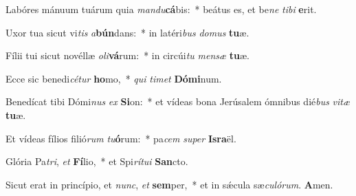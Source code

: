 ﻿\item Labóres mánuum tuárum quia \textit{man}\textit{du}\textbf{cá}bis:~* beátus es, et be\textit{ne} \textit{ti}\textit{bi} \textbf{e}rit.
\item Uxor tua sicut vi\textit{tis} \textit{a}\-\textbf{bún}\-dans:~* in latéri\textit{bus} \textit{do}\textit{mus} \textbf{tu}æ.
\item Fílii tui sicut novéllæ \textit{o}\-\textit{li}\-\textbf{vá}\-rum:~* in circúi\textit{tu} \textit{men}\textit{sæ} \textbf{tu}æ.
\item Ecce sic benedi\textit{cé}\textit{tur} \textbf{ho}\-mo,~* \textit{qui} \textit{ti}\textit{met} \textbf{Dó}\textbf{mi}num.
\item Benedícat tibi Dómi\textit{nus} \textit{ex} \textbf{Si}on:~* et vídeas bona Jerúsalem ómnibus dié\textit{bus} \textit{vi}\textit{tæ} \textbf{tu}æ.
\item Et vídeas fílios filió\textit{rum} \textit{tu}\-\textbf{ó}\-rum:~* pa\textit{cem} \textit{su}\textit{per} \textbf{Is}\textbf{ra}ël.
\item Glória Pa\textit{tri}, \textit{et} \textbf{Fí}lio,~* et Spi\textit{rí}\textit{tu}\textit{i} \textbf{San}cto.
\item Sicut erat in princípio, et \textit{nunc}, \textit{et} \textbf{sem}per,~* et in sǽcula sæ\textit{cu}\textit{ló}\textit{rum}. \textbf{A}men.